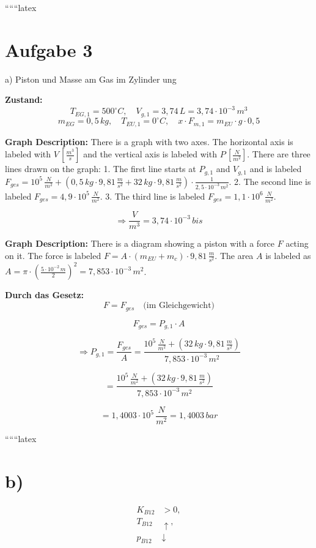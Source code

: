 
``````latex


\section*{Aufgabe 3}

a) Piston und Masse am Gas im Zylinder ung

\textbf{Zustand:}
\[
T_{EG,1} = 500^\circ C, \quad V_{g,1} = 3,74 \, L = 3,74 \cdot 10^{-3} \, m^3
\]
\[
m_{EG} = 0,5 \, kg, \quad T_{EU,1} = 0^\circ C, \quad x \cdot F_{m,1} = m_{EU} \cdot g \cdot 0,5
\]

\textbf{Graph Description:}
There is a graph with two axes. The horizontal axis is labeled with $V \, \left[\frac{m^3}{s}\right]$ and the vertical axis is labeled with $P \, \left[\frac{N}{m^2}\right]$. There are three lines drawn on the graph:
1. The first line starts at $P_{g,1}$ and $V_{g,1}$ and is labeled $F_{ges} = 10^5 \, \frac{N}{m^2} + \left(0,5 \, kg \cdot 9,81 \, \frac{m}{s^2} + 32 \, kg \cdot 9,81 \, \frac{m}{s^2}\right) \cdot \frac{1}{2,5 \cdot 10^{-3} \, m^2}$.
2. The second line is labeled $F_{ges} = 4,9 \cdot 10^5 \, \frac{N}{m^2}$.
3. The third line is labeled $F_{ges} = 1,1 \cdot 10^6 \, \frac{N}{m^2}$.

\[
\Rightarrow \frac{V}{m^3} = 3,74 \cdot 10^{-3} \, bis
\]

\textbf{Graph Description:}
There is a diagram showing a piston with a force $F$ acting on it. The force is labeled $F = A \cdot \left(m_{EU} + m_{c}\right) \cdot 9,81 \, \frac{m}{s^2}$. The area $A$ is labeled as $A = \pi \cdot \left(\frac{5 \cdot 10^{-2} \, m}{2}\right)^2 = 7,853 \cdot 10^{-3} \, m^2$.

\textbf{Durch das Gesetz:}
\[
F = F_{ges} \quad \text{(im Gleichgewicht)}
\]

\[
F_{ges} = P_{g,1} \cdot A
\]

\[
\Rightarrow P_{g,1} = \frac{F_{ges}}{A} = \frac{10^5 \, \frac{N}{m^2} + \left(32 \, kg \cdot 9,81 \, \frac{m}{s^2}\right)}{7,853 \cdot 10^{-3} \, m^2}
\]

\[
= \frac{10^5 \, \frac{N}{m^2} + \left(32 \, kg \cdot 9,81 \, \frac{m}{s^2}\right)}{7,853 \cdot 10^{-3} \, m^2}
\]

\[
= 1,4003 \cdot 10^5 \, \frac{N}{m^2} = 1,4003 \, bar
\]

``````latex


\section*{b)}
\begin{align*}
    K_{B12} &> 0, \\
    T_{B12} & \uparrow, \\
    p_{B12} & \downarrow
\end{align*}

